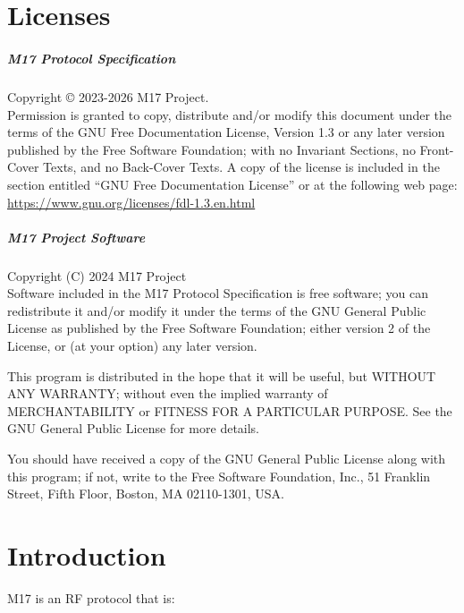 \documentclass[a4paper,11pt,oneside]{book}
\begin{document}
\chapter{Licenses}

\paragraph{M17 Protocol Specification}

Copyright \copyright{}  2023-2026  M17 Project. \\

Permission is granted to copy, distribute and/or modify this document under the terms of the GNU Free Documentation License, Version 1.3 or any later version published by the Free Software Foundation; with no Invariant Sections, no Front-Cover Texts, and no Back-Cover Texts. A copy of the license is included in the section entitled ``GNU Free Documentation License'' or at the following web page: \href{https://www.gnu.org/licenses/fdl-1.3.en.html}{https://www.gnu.org/licenses/fdl-1.3.en.html}

\paragraph{M17 Project Software}

Copyright (C) 2024  M17 Project \\

Software included in the M17 Protocol Specification is free software; you can redistribute it and/or modify it under the terms of the GNU General Public License as published by the Free Software Foundation; either version 2 of the License, or (at your option) any later version.

This program is distributed in the hope that it will be useful, but WITHOUT ANY WARRANTY; without even the implied warranty of MERCHANTABILITY or FITNESS FOR A PARTICULAR PURPOSE.  See the GNU General Public License for more details.

You should have received a copy of the GNU General Public License along with this program; if not, write to the Free Software Foundation, Inc., 51 Franklin Street, Fifth Floor, Boston, MA  02110-1301, USA.

\chapter{Introduction}

M17 is an RF protocol that is:
\end{document}
